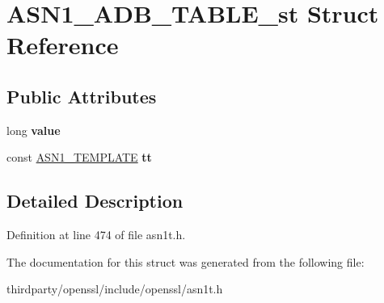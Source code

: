 \hypertarget{struct_a_s_n1___a_d_b___t_a_b_l_e__st}{}\section{A\+S\+N1\+\_\+\+A\+D\+B\+\_\+\+T\+A\+B\+L\+E\+\_\+st Struct Reference}
\label{struct_a_s_n1___a_d_b___t_a_b_l_e__st}
\subsection*{Public Attributes}
\begin{DoxyCompactItemize}
\item 
\mbox{\label{struct_a_s_n1___a_d_b___t_a_b_l_e__st_a629d5818b02f9fb52b74bad469e1e5b0}} 
long {\bfseries value}
\item 
\mbox{\label{struct_a_s_n1___a_d_b___t_a_b_l_e__st_ae2a3f9d776e8c11c09d8b9879c63fac2}} 
const \hyperlink{struct_a_s_n1___t_e_m_p_l_a_t_e__st}{A\+S\+N1\+\_\+\+T\+E\+M\+P\+L\+A\+TE} {\bfseries tt}
\end{DoxyCompactItemize}


\subsection{Detailed Description}


Definition at line 474 of file asn1t.\+h.



The documentation for this struct was generated from the following file\+:\begin{DoxyCompactItemize}
\item 
thirdparty/openssl/include/openssl/asn1t.\+h\end{DoxyCompactItemize}
